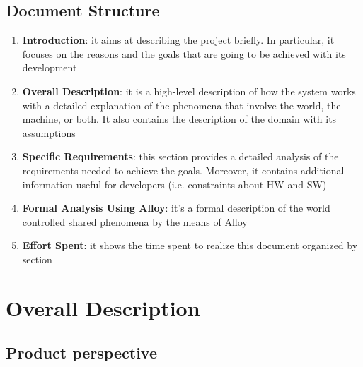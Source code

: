 \section{Document Structure }
\begin{enumerate}
    \item \textbf{Introduction}: it aims at describing the project briefly. In particular, it focuses on the reasons and the goals that are going to be achieved with its development
    \item \textbf{Overall Description}: it is a high-level description of how the system works with a detailed explanation of the phenomena that involve the world, the machine, or
    both. It also contains the description of the domain with its assumptions
    \item \textbf{Specific Requirements}: this section provides a detailed analysis of the requirements needed to achieve the goals. Moreover, it contains additional information useful for developers (i.e. constraints about HW and SW)
    \item \textbf{Formal Analysis Using Alloy}: it’s a formal description of the world controlled shared phenomena by the means of Alloy
    \item \textbf{Effort Spent}: it shows the time spent to realize this document organized by section\end{enumerate}

\newpage

\chapter{Overall Description }
\label{Overall Description}

\section{Product perspective }
